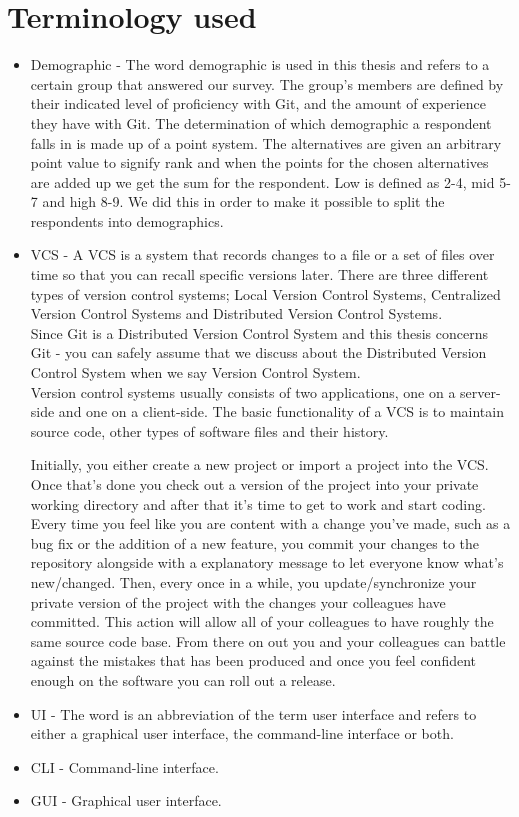 \documentclass[a4paper,oneside]{bth} %
\begin{document}
			\section{Terminology used}
			\begin{itemize}
				\item Demographic - The word demographic is used in this thesis and refers to a certain group that answered our survey. The group's members are defined by their indicated level of proficiency with Git, and the amount of experience they have with Git. The determination of which demographic a respondent falls in is made up of a point system. The alternatives are given an arbitrary point value to signify rank and when the points for the chosen alternatives are added up we get the sum for the respondent. Low is defined as 2-4, mid 5-7 and high 8-9. We did this in order to make it possible to split the respondents into demographics.
				\item VCS - A VCS is a system that records changes to a file or a set of files over time so that you can recall specific versions later.
				There are three different types of version control systems; Local Version Control Systems, Centralized Version Control Systems and Distributed Version Control Systems.\\
				Since Git is a Distributed Version Control System and this thesis concerns Git - you can safely assume that we discuss about the Distributed Version Control System when we say Version Control System.\cite{typesOfVCS}\\
				Version control systems usually consists of two applications, one on a server-side and one on a client-side.
				The basic functionality of a VCS is to maintain source code, other types of software files and their history.\cite{FoundationVCforWebDevs}
				
				Initially, you either create a new project or import a project into the VCS.
				Once that's done you check out a version of the project into your private working directory and after that it's time to get to work and start coding.
				Every time you feel like you are content with a change you've made, such as a bug fix or the addition of a new feature, you commit your changes to the repository alongside with a explanatory message to let everyone know what's new/changed.
				Then, every once in a while, you update/synchronize your private version of the project with the changes your colleagues have committed.
				This action will allow all of your colleagues to have roughly the same source code base. From there on out you and your colleagues can battle against the mistakes that has been produced  and once you feel confident enough on the software you can roll out a release.\cite{vcsExplanation}
				\item UI - The word is an abbreviation of the term user interface and refers to either a graphical user interface, the command-line interface or both.
				\item CLI - Command-line interface.
				\item GUI - Graphical user interface.
			\end{itemize}
			
\end{document}
